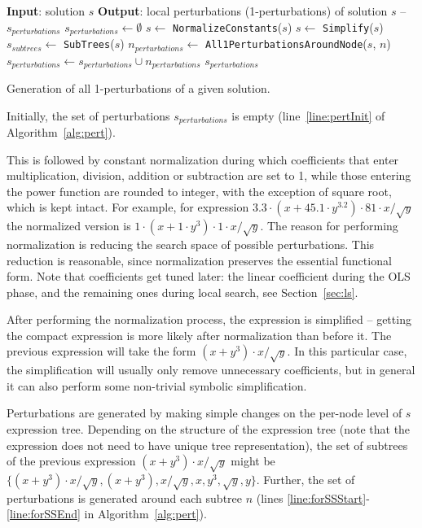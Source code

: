 \documentclass{bmcart}
\begin{document}
\begin{algorithm}
    
	\begin{algorithmic}[1] 
		\Statex   \textbf{Input}: solution $s$ 
		\Statex \textbf{Output}: local perturbations (1-perturbations) of solution $s$ -- $s_{perturbations}$
		\State $s_{perturbations} \gets \emptyset$ \label{line:pertInit}
		\State $s \gets$ \texttt{NormalizeConstants}($s$)
		\State $s \gets$ \texttt{Simplify}($s$)
		\State $s_{subtrees} \gets$ \texttt{SubTrees}($s$)
		 \label{line:forSSStart}
		\State $n_{perturbations} \gets$ \texttt{All1PerturbationsAroundNode}($s$, $n$)
		\State $s_{perturbations} \gets s_{perturbations} \cup n_{perturbations}$	
		\EndFor \label{line:forSSEnd}
		\State \Return $s_{perturbations}$
		\EndProcedure
	\end{algorithmic}
	\caption{Generation of all 1-perturbations of a given solution.}
	\label{alg:pert}
\end{algorithm}  

Initially, the set of perturbations $s_{perturbations}$ is empty (line~\ref{line:pertInit} of Algorithm~\ref{alg:pert}).


This is followed by constant normalization during which coefficients that enter multiplication, division, addition or subtraction are set to 1, while those entering the power function are rounded to integer, with the exception of square root, which is kept intact. For example, for expression $3.3\cdot(x+45.1\cdot y^{3.2})\cdot 81\cdot x/\sqrt{y}$ the normalized version is $1\cdot (x+1\cdot y^3)\cdot 1\cdot x/\sqrt{y}$. The reason for performing normalization is reducing the search space of possible perturbations. This reduction is reasonable, since normalization preserves the essential functional form. Note that coefficients get tuned later: the linear coefficient during the OLS phase, and the remaining ones during local search, see Section~\ref{sec:ls}. 


After performing the normalization process, the expression is simplified -- getting the compact expression is more likely after normalization than before it. The previous expression will take the form $(x+y^3)\cdot x/\sqrt{y}$. In this particular case, the simplification will usually only remove unnecessary coefficients, but in general it can also perform some non-trivial symbolic simplification. 


Perturbations are generated by making simple changes on the per-node level of $s$ expression tree.
Depending on the structure of the expression tree (note that the expression does not need to have unique tree representation), the set of subtrees of the previous expression $(x+y^3)\cdot x/\sqrt{y}$ might be $\{(x+y^3)\cdot x/\sqrt{y}, (x+y^3), x/\sqrt{y}, x, y^3, \sqrt{y}, y\}$. %
Further, the set of perturbations is generated around each subtree $n$ (lines \ref{line:forSSStart}-\ref{line:forSSEnd} in Algorithm~\ref{alg:pert}).   
\end{document}
